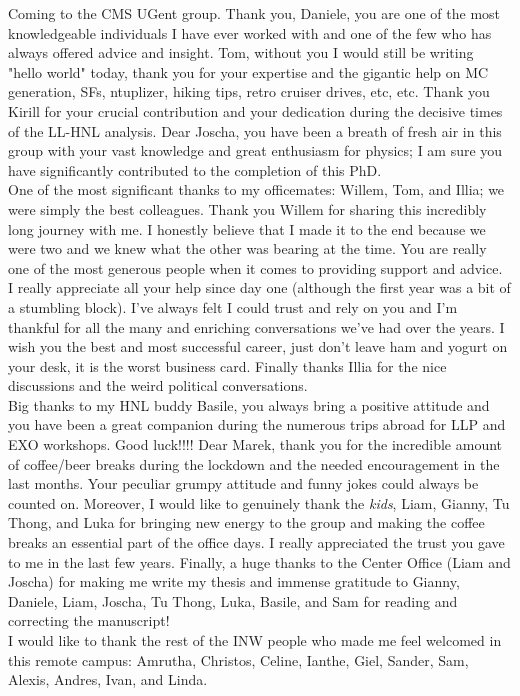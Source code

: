 \begin{acknowledgements}
Coming to the CMS UGent group. Thank you, Daniele, you are one of the most knowledgeable individuals I have ever worked with and one of the few who has always offered advice and insight.
Tom, without you I would still be writing "hello world" today, thank you for your expertise and the gigantic help on MC generation, SFs, ntuplizer, hiking tips, retro cruiser drives, etc, etc.
Thank you Kirill for your crucial contribution and your dedication during the decisive times of the LL-HNL analysis. 
Dear Joscha, you have been a breath of fresh air in this group with your vast knowledge and great enthusiasm for physics; I am sure you have significantly contributed to the completion of this PhD. \\
One of the most significant thanks to my officemates: Willem, Tom, and Illia; we were simply the best colleagues. Thank you Willem for sharing this incredibly long journey with me. I honestly believe that I made it to the end because we were two and we knew what the other was bearing at the time. You are really one of the most generous people when it comes to providing support and advice. I really appreciate all your help since day one (although the first year was a bit of a stumbling block). I've always felt I could trust and rely on you and I'm thankful for all the many and enriching conversations we've had over the years. I wish you the best and most successful career, just don't leave ham and yogurt on your desk, it is the worst business card. Finally thanks Illia for the nice discussions and the weird political conversations.\\
Big thanks to my HNL buddy Basile, you always bring a positive attitude and you have been a great companion during the numerous trips abroad for LLP and EXO workshops. Good luck!!!! Dear Marek, thank you for the incredible amount of coffee/beer breaks during the lockdown and the needed encouragement in the last months. Your peculiar grumpy attitude and funny jokes could always be counted on.  
Moreover, I would like to genuinely thank the \emph{kids}, Liam, Gianny, Tu Thong, and Luka for bringing new energy to the group and making the coffee breaks an essential part of the office days. I really appreciated the trust you gave to me in the last few years. 
Finally, a huge thanks to the Center Office (Liam and Joscha) for making me write my thesis and immense gratitude to Gianny, Daniele, Liam, Joscha, Tu Thong, Luka, Basile, and Sam for reading and correcting the manuscript! \\
I would like to thank the rest of the INW people who made me feel welcomed in this remote campus: Amrutha, Christos, Celine, Ianthe, Giel, Sander, Sam, Alexis, Andres, Ivan, and Linda. \\


\end{acknowledgements}

